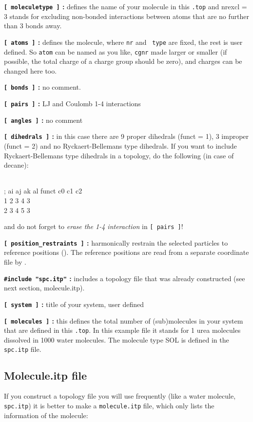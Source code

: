 {\bf {\tt [~moleculetype~]} :} defines the name of your molecule in
this {\tt *.top} and nrexcl = 3 stands for excluding non-bonded
interactions between atoms that are no further than 3 bonds away.

{\bf {\tt [~atoms~]} :} defines the molecule, where {\tt nr} and {\tt
type} are fixed, the rest is user defined. So {\tt atom} can be named
as you like, {\tt cgnr} made larger or smaller (if possible, the total
charge of a charge group should be zero), and charges can be changed
here too.

{\bf {\tt [~bonds~]} :} no comment.

{\bf {\tt [~pairs~]} :} LJ and Coulomb 1-4 interactions

{\bf {\tt [~angles~]} :} no comment

{\bf {\tt [~dihedrals~]} :} in this case there are 9 proper dihedrals
(funct = 1), 3 improper (funct = 2) and no Ryckaert-Bellemans type
dihedrals. If you want to include Ryckaert-Bellemans type dihedrals
in a topology, do the following (in case of {\eg} decane):
\begin{tt}
[ dihedrals ]\\
;  ai    aj    ak    al funct       c0       c1       c2\\
    1    2     3     4     3 \\
    2    3     4     5     3\\
\end{tt}
and do not forget to {\em erase the 1-4 interaction} 
in {\tt [~pairs~]}!

{\bf {\tt [~position\_restraints~]} :} harmonically restrain the selected particles
to reference positions (). 
The reference positions are read from a 
separate coordinate file by .

{\bf {\tt \#include "spc.itp"} :} includes a topology file that was already
constructed (see next section, molecule.itp).

{\bf {\tt [~system~]} :} title of your system, user defined

{\bf {\tt [~molecules~]} :} this defines the total number of (sub)molecules
in your system that are defined in this {\tt *.top}. In this
example file it stands for 1 urea molecules dissolved in 1000 water
molecules. The molecule type SOL is defined in the {\tt spc.itp} file.

\subsection{Molecule.itp file}
\label{subsec:molitp}
If you construct a topology file you will use frequently (like a water
molecule, {\tt spc.itp}) it is better to make a {\tt molecule.itp}
file, which only lists the information of the molecule: 


